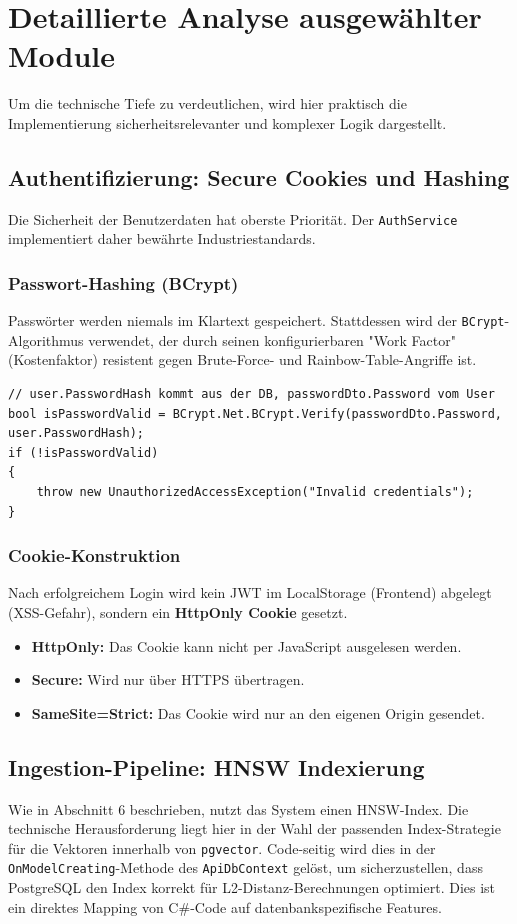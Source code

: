 \section{Detaillierte Analyse ausgewählter Module}
Um die technische Tiefe zu verdeutlichen, wird hier praktisch die Implementierung sicherheitsrelevanter und komplexer Logik dargestellt.

\subsection{Authentifizierung: Secure Cookies und Hashing}
Die Sicherheit der Benutzerdaten hat oberste Priorität. Der \texttt{AuthService} implementiert daher bewährte Industriestandards.

\subsubsection{Passwort-Hashing (BCrypt)}
Passwörter werden niemals im Klartext gespeichert. Stattdessen wird der \texttt{BCrypt}-Algorithmus \cite{provos1999bcrypt} verwendet, der durch seinen konfigurierbaren "Work Factor" (Kostenfaktor) resistent gegen Brute-Force- und Rainbow-Table-Angriffe ist.
\begin{lstlisting}[language={[Sharp]C}, caption={Verifizierung im AuthService}]
// user.PasswordHash kommt aus der DB, passwordDto.Password vom User
bool isPasswordValid = BCrypt.Net.BCrypt.Verify(passwordDto.Password, user.PasswordHash);
if (!isPasswordValid)
{
    throw new UnauthorizedAccessException("Invalid credentials");
}
\end{lstlisting}

\subsubsection{Cookie-Konstruktion}
Nach erfolgreichem Login wird kein JWT im LocalStorage (Frontend) abgelegt (XSS-Gefahr), sondern ein \textbf{HttpOnly Cookie} gesetzt.
\begin{itemize}
    \item \textbf{HttpOnly:} Das Cookie kann nicht per JavaScript ausgelesen werden.
    \item \textbf{Secure:} Wird nur über HTTPS übertragen.
    \item \textbf{SameSite=Strict:} Das Cookie wird nur an den eigenen Origin gesendet.
\end{itemize}

\subsection{Ingestion-Pipeline: HNSW Indexierung}
Wie in Abschnitt 6 beschrieben, nutzt das System einen HNSW-Index. Die technische Herausforderung liegt hier in der Wahl der passenden Index-Strategie für die Vektoren innerhalb von \texttt{pgvector}. Code-seitig wird dies in der \texttt{OnModelCreating}-Methode des \texttt{ApiDbContext} gelöst, um sicherzustellen, dass PostgreSQL den Index korrekt für L2-Distanz-Berechnungen optimiert. Dies ist ein direktes Mapping von C\#-Code auf datenbankspezifische Features.
